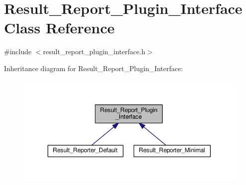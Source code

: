 \hypertarget{classResult__Report__Plugin__Interface}{}\section{Result\+\_\+\+Report\+\_\+\+Plugin\+\_\+\+Interface Class Reference}
\label{classResult__Report__Plugin__Interface}


{\ttfamily \#include $<$result\+\_\+report\+\_\+plugin\+\_\+interface.\+h$>$}



Inheritance diagram for Result\+\_\+\+Report\+\_\+\+Plugin\+\_\+\+Interface\+:\nopagebreak
\begin{figure}[H]
\begin{center}
\leavevmode
\includegraphics[width=350pt]{classResult__Report__Plugin__Interface__inherit__graph}
\end{center}
\end{figure}
